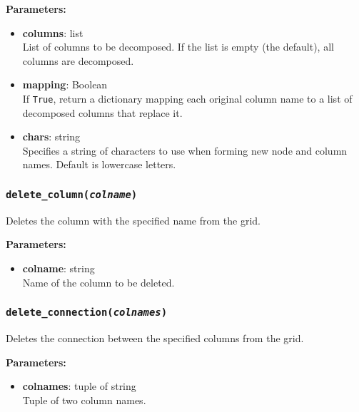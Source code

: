 \textbf{Parameters:}
\begin{itemize}
\item \textbf{columns}: list\\
  List of columns to be decomposed. If the list is empty (the default), all columns are decomposed.
\item \textbf{mapping}: Boolean\\
  If \texttt{True}, return a dictionary mapping each original column name to a list of decomposed columns that replace it.
\item \textbf{chars}: string\\
  Specifies a string of characters to use when forming new node and column names.  Default is lowercase letters.
\end{itemize}

\begin{snugshade}\subsubsection{\texttt{delete\_column(\emph{colname})}}\end{snugshade}
\label{sec:mulgrid:delete_column}

Deletes the column with the specified name from the grid.

\textbf{Parameters:}
\begin{itemize}
\item \textbf{colname}: string\\
  Name of the column to be deleted.
\end{itemize}

\begin{snugshade}\subsubsection{\texttt{delete\_connection(\emph{colnames})}}\end{snugshade}
\label{sec:mulgrid:delete_connection}

Deletes the connection between the specified columns from the grid.

\textbf{Parameters:}
\begin{itemize}
\item \textbf{colnames}: tuple of string\\
  Tuple of two column names.
\end{itemize}

